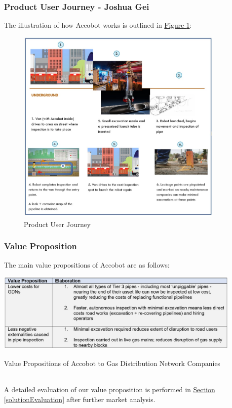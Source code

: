 \documentclass[11pt]{article}		%
\newcommand{\figref}[1]{\hyperref[#1]{Figure \ref*{#1}}}    %
\newcommand{\sectref}[1]{\hyperref[#1]{Section \ref*{#1}}}     %
\begin{document}
	\subsubsection[Product User Journey]{Product User Journey - Joshua Gei}
	The illustration of how Accobot works is outlined in \figref{userjourney}:
	\begin{figure}[h]
				\centering
				\includegraphics[width=0.9\textwidth]{userjourneyfull.jpg}
				\caption{Product User Journey}
				\label{userjourney}
			\end{figure}
	\subsubsection[Value Proposition]{Value Proposition}
	The main value propositions of Accobot are as follows:
        \begin{table}[h]
			\centering
			\includegraphics[width=0.9\textwidth]{ValueProposition.jpg}
			\caption{Value Propositions of Accobot to Gas Distribution Network Companies}
			\label{VP}
 		\end{table}
 	\vspace{-0.2cm}
	\\A detailed evaluation of our value proposition is performed in \sectref{solutionEvaluation} after further market analysis.
	
\end{document}
